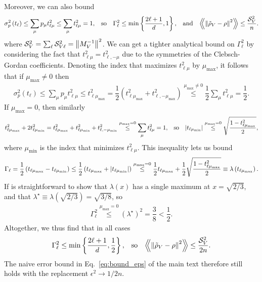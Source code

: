 \documentclass[notitlepage,twocolumn]{revtex4-2}
\renewcommand{\t}{\text} %
\newcommand{\f}[2]{\dfrac{#1}{#2}} %
\newcommand{\p}[1]{\left(#1\right)} %
\renewcommand{\Set}[1]{\left\{#1\right\}} %
\newcommand{\Bbk}[1]
{\left\langle\!\!\left\langle #1 \right\rangle\!\!\right\rangle}
\renewcommand{\S}{\mathcal{S}}
\newcommand{\1}{\mathds{1}}
\begin{document}
Moreover, we can also bound
\begin{align}
  \sigma_p^2\p{t_\ell} \le \sum_\mu p_\mu t_{\ell\mu}^2
  \le \sum_\mu t_{\ell\mu}^2 = 1,
  &&
  \t{so}
  &&
  \Gamma_\ell^2 \le \min\Set{\f{2\ell+1}{d}, 1},
  &&
  \t{and}
  &&
  \Bbk{\norm{\tilde\rho_V-\rho}^2} \le \f{\S_V^2}{n}.
\end{align}
where $\S_V^2=\sum_\ell\S_{V\ell}^2=\norm{M_V^{-1}}^2$.
We can get a tighter analytical bound on $\Gamma_\ell^2$ by considering the fact that $t_{\ell\mu}^2 = t_{\ell,-\mu}^2$ due to the symmetries of the Clebsch-Gordan coefficients.
Denoting the index that maximizes $t_{\ell\mu}^2$ by $\mu_{\t{max}}$, it follows that if $\mu_{\t{max}}\ne0$ then
\begin{align}
  \sigma_p^2\p{t_\ell} \le \sum_\mu p_\mu t_{\ell\mu}^2
  \le t_{\ell\mu_{\t{max}}}^2
  = \f12 \p{t_{\ell\mu_{\t{max}}}^2 + t_{\ell,-\mu_{\t{max}}}^2}
  \stackrel{\mu_{\t{max}}\ne0}{\le} \f12 \sum_\mu t_{\ell\mu}^2
  = \f12.
\end{align}
If $\mu_{\t{max}}=0$, then similarly
\begin{align}
  t_{\ell\mu_{\t{max}}}^2 + 2 t_{\ell\mu_{\t{min}}}^2
  = t_{\ell\mu_{\t{max}}}^2 + t_{\ell\mu_{\t{min}}}^2
  + t_{\ell,-\mu_{\t{min}}}^2
  \stackrel{\mu_{\t{max}}=0}{\le}
  \sum_\mu t_{\ell\mu}^2 = 1,
  &&
  \t{so}
  &&
  \abs{t_{\ell\mu_{\t{min}}}}
  \stackrel{\mu_{\t{max}}=0}{\le}
  \sqrt{\f{1 - t_{\ell\mu_{\t{max}}}^2}{2}},
\end{align}
where $\mu_{\t{min}}$ is the index that minimizes $t_{\ell\mu}^2$.
This inequality lets us bound
\begin{align}
  \Gamma_\ell
  = \f12 \p{t_{\ell\mu_{\t{max}}} - t_{\ell\mu_{\t{min}}}}
  \le \f12 \p{t_{\ell\mu_{\t{max}}} + \abs{t_{\ell\mu_{\t{min}}}}}
  \stackrel{\mu_{\t{max}}=0}{\le}
  \f12 t_{\ell\mu_{\t{max}}}
  + \f12\sqrt{\f{1 - t_{\ell\mu_{\t{max}}}^2}{2}}
  \equiv \lambda\p{t_{\ell\mu_{\t{max}}}}.
\end{align}
If is straightforward to show that $\lambda\p{x}$ has a single maximum at $x=\sqrt{2/3}$, and that $\lambda^\star\equiv \lambda\p{\sqrt{2/3}}=\sqrt{3/8}$, so
\begin{align}
  \Gamma_\ell^2
  \stackrel{\mu_{\t{max}}=0}{\le} \p{\lambda^\star}^2
  = \f38 < \f12.
\end{align}
Altogether, we thus find that in all cases
\begin{align}
  \Gamma_\ell^2 \le \min\Set{\f{2\ell+1}{d}, \f12},
  &&
  \t{so}
  &&
  \Bbk{\norm{\tilde\rho_V-\rho}^2}
  \le \f{\S_V^2}{2n}.
\end{align}
The naive error bound in Eq.~\eqref{eq:bound_eps} of the main text therefore still holds with the replacement $\epsilon^2\to1/2n$.
\end{document}
